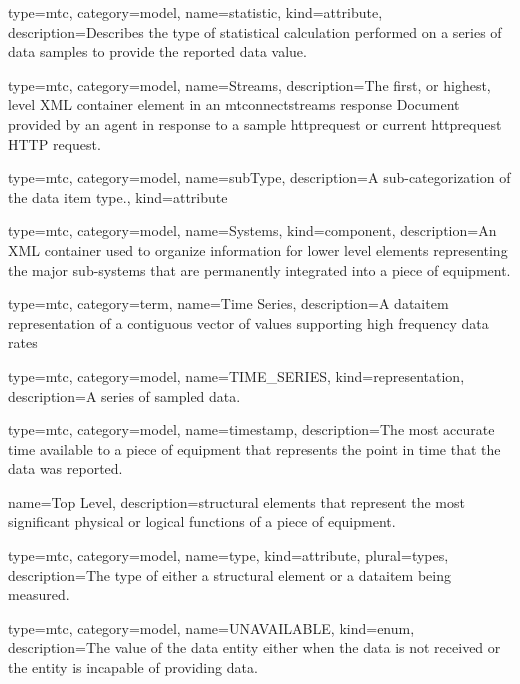 {
  type=mtc,
  category=model,
  name={statistic},
  kind={attribute},
  description={Describes the type of statistical calculation performed on a series of data samples to provide the reported data value.}
}


{
  type=mtc,
  category=model,
  name={Streams},
  description={The first, or highest, level XML container element in an \gls{mtconnectstreams} \gls{response} Document provided by an \gls{agent} in response to a \gls{sample httprequest} or \gls{current httprequest} HTTP \gls{request}.}
}


{
  type=mtc,
  category=model,
  name={subType},
  description={A sub-categorization of the data item \gls{type}.},
  kind={attribute}
}

{
  type=mtc,
  category=model,
  name={Systems},
  kind={component},
  description={An XML container used to organize information for \gls{lower level} elements representing the major sub-systems that are permanently integrated into a piece of equipment.}
}


{
  type=mtc,
  category=term,
  name={Time Series},
  description={A \gls{dataitem} representation of a contiguous vector of values supporting high frequency data rates}
}


{
  type=mtc,
  category=model,
  name={TIME\_SERIES},
  kind={representation},
  description={A series of sampled data. }
}


{
  type=mtc,
  category=model,
  name={timestamp},
  description={The most accurate time available to a piece of equipment that represents the point in time that the data was reported.}
}


{
  name={Top Level},
  description={\glspl{structural element} that represent the most significant physical or logical functions of a piece of equipment.}
}


{
  type=mtc,
  category=model,
  name={type},
  kind={attribute},
  plural={types},
  description={The type of either a \gls{structural element} or a \gls{dataitem} being measured.}
}


{
  type=mtc,
  category=model,
  name={UNAVAILABLE},
  kind={enum},
  description={The value of the \gls{data entity} either when the data is not received or the entity is incapable of providing data.}
}


